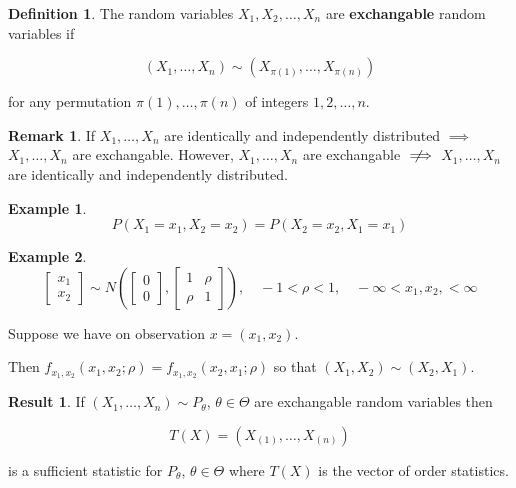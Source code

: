 \documentclass[12pt]{article}
\theoremstyle{definition}
\newtheorem*{definition}{Definition}
\newtheorem*{example}{Example}
\newtheorem*{remark}{Remark}
\newtheorem*{result}{Result}
\newcommand{\notimplies}{%
  \mathrel{{\ooalign{\hidewidth$\not\phantom{=}$\hidewidth\cr$\implies$}}}}
\begin{document}
\begin{definition}
The random variables $X_1, X_2, \ldots, X_n$ are \textbf{exchangable} 
random variables if

\begin{equation*}
(X_1, \ldots, X_n) \sim (X_{\pi(1)}, \ldots, X_{\pi(n)})
\end{equation*}

for any permutation $\pi(1), \ldots, \pi(n)$ of integers $1, 2, \ldots, n$.
\end{definition}

\begin{remark}
If $X_1, \ldots, X_n$ are identically and independently distributed 
$\implies$ $X_1, \ldots, X_n$ are exchangable. However, $X_1, \ldots, X_n$
are exchangable $\notimplies$ $X_1, \ldots, X_n$ are identically and
independently distributed.
\end{remark}

\begin{example}
\begin{equation*}
P(X_1 = x_1, X_2 = x_2) = P(X_2 = x_2, X_1 = x_1)
\end{equation*}
\end{example}

\begin{example}

\begin{equation*}
\begin{bmatrix}
x_1 \\
x_2
\end{bmatrix} \sim
N \left(
\begin{bmatrix}
0 \\
0
\end{bmatrix}
,
\begin{bmatrix}
1 & \rho \\
\rho & 1
\end{bmatrix}
\right),
\quad
-1 < \rho < 1,
\quad
-\infty < x_1, x_2, < \infty
\end{equation*}

Suppose we have on observation $x = (x_1, x_2)$.

Then $f_{x_1, x_2}(x_1, x_2 ; \rho) = f_{x_1, x_2}(x_2, x_1; \rho)$ so that
$(X_1, X_2) \sim (X_2, X_1)$.
\end{example}

\begin{result}
If $(X_1, \ldots, X_n) \sim P_{\theta}$, $\theta \in \Theta$ are
exchangable random variables then 

$$ T(X) = (X_{(1)}, \ldots, X_{(n)}) $$

is a sufficient statistic for $P_{\theta}$, $\theta \in \Theta$ where
$T(X)$ is the vector of order statistics.
\end{result}
\end{document}
